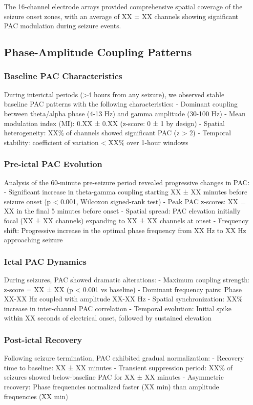 The 16-channel electrode arrays provided comprehensive spatial coverage of the seizure onset zones, with an average of XX ± XX channels showing significant PAC modulation during seizure events.

\subsection{Phase-Amplitude Coupling Patterns}

\subsubsection{Baseline PAC Characteristics}
During interictal periods (>4 hours from any seizure), we observed stable baseline PAC patterns with the following characteristics:
- Dominant coupling between theta/alpha phase (4-13 Hz) and gamma amplitude (30-100 Hz)
- Mean modulation index (MI): 0.XX ± 0.XX (z-score: 0 ± 1 by design)
- Spatial heterogeneity: XX\% of channels showed significant PAC (z > 2)
- Temporal stability: coefficient of variation < XX\% over 1-hour windows

\subsubsection{Pre-ictal PAC Evolution}
Analysis of the 60-minute pre-seizure period revealed progressive changes in PAC:
- Significant increase in theta-gamma coupling starting XX ± XX minutes before seizure onset (p < 0.001, Wilcoxon signed-rank test)
- Peak PAC z-scores: XX ± XX in the final 5 minutes before onset
- Spatial spread: PAC elevation initially focal (XX ± XX channels) expanding to XX ± XX channels at onset
- Frequency shift: Progressive increase in the optimal phase frequency from XX Hz to XX Hz approaching seizure

\subsubsection{Ictal PAC Dynamics}
During seizures, PAC showed dramatic alterations:
- Maximum coupling strength: z-score = XX ± XX (p < 0.001 vs baseline)
- Dominant frequency pairs: Phase XX-XX Hz coupled with amplitude XX-XX Hz
- Spatial synchronization: XX\% increase in inter-channel PAC correlation
- Temporal evolution: Initial spike within XX seconds of electrical onset, followed by sustained elevation

\subsubsection{Post-ictal Recovery}
Following seizure termination, PAC exhibited gradual normalization:
- Recovery time to baseline: XX ± XX minutes
- Transient suppression period: XX\% of seizures showed below-baseline PAC for XX ± XX minutes
- Asymmetric recovery: Phase frequencies normalized faster (XX min) than amplitude frequencies (XX min)


